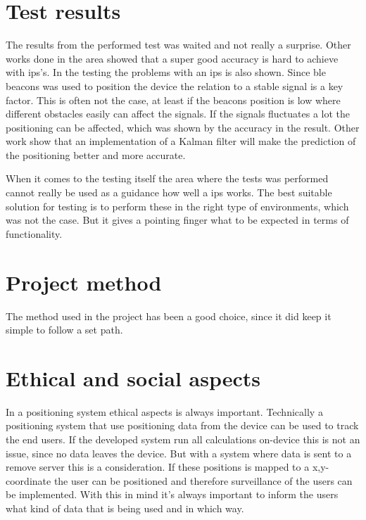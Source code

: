 \section{Test results}\label{sec:discussionResult}
The results from the performed test was waited and not really a surprise.
Other works done in the area showed that a super good accuracy is hard to achieve with \acrshort{ips}'s.
In the testing the problems with an \acrshort{ips} is also shown. 
Since \acrlong{ble} beacons was used to position the device the relation to a stable signal is a key factor.
This is often not the case, at least if the beacons position is low where different obstacles easily can affect the signals.
If the signals fluctuates a lot the positioning can be affected, which was shown by the accuracy in the result.
Other work show that an implementation of a Kalman filter will make the prediction of the positioning better and more accurate.

\bigskip

When it comes to the testing itself the area where the tests was performed cannot really be used as a guidance how well a \acrshort{ips} works.
The best suitable solution for testing is to perform these in the right type of environments, which was not the case.
But it gives a pointing finger what to be expected in terms of functionality.


\section{Project method}\label{sec:discussionMethod}
The method used in the project has been a good choice, since it did keep it simple to follow a set path.






\section{Ethical and social aspects}\label{sec:discussionAspects}
In a positioning system ethical aspects is always important.
Technically a positioning system that use positioning data from the device can be used to track the end users.
If the developed system run all calculations on-device this is not an issue, since no data leaves the device.
But with a system where data is sent to a remove server this is a consideration.
If these positions is mapped to a x,y-coordinate the user can be positioned and therefore surveillance of the users can be implemented.
With this in mind it's always important to inform the users what kind of data that is being used and in which way.

